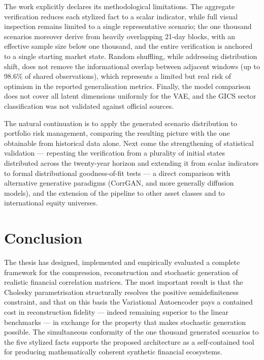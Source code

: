 \documentclass[11pt,a4paper]{article}
\begin{document}
The work explicitly declares its methodological limitations. The aggregate
verification reduces each stylized fact to a scalar indicator, while full
visual inspection remains limited to a single representative scenario; the one
thousand scenarios moreover derive from heavily overlapping 21-day blocks, with
an effective sample size below one thousand, and the entire verification is
anchored to a single starting market state. Random shuffling, while addressing
distribution shift, does not remove the informational overlap between adjacent
windows (up to 98.6\% of shared observations), which represents a limited but
real risk of optimism in the reported generalisation metrics. Finally, the
model comparison does not cover all latent dimensions uniformly for the VAE,
and the GICS sector classification was not validated against official sources.

The natural continuation is to apply the generated scenario distribution to
portfolio risk management, comparing the resulting picture with the one
obtainable from historical data alone. Next come the strengthening of
statistical validation --- repeating the verification from a plurality of
initial states distributed across the twenty-year horizon and extending it from
scalar indicators to formal distributional goodness-of-fit tests --- a direct
comparison with alternative generative paradigms (CorrGAN, and more generally
diffusion models), and the extension of the pipeline to other asset classes and
to international equity universes.

\section{Conclusion}

The thesis has designed, implemented and empirically evaluated a complete framework for the
compression, reconstruction and stochastic generation of realistic financial
correlation matrices. The most important result is that the Cholesky
parametrisation structurally resolves the positive semidefiniteness constraint,
and that on this basis the Variational Autoencoder pays a contained cost in
reconstruction fidelity --- indeed remaining superior to the linear benchmarks
--- in exchange for the property that makes stochastic generation possible.
The simultaneous conformity of the one thousand generated scenarios to the five
stylized facts supports the proposed architecture as a self-contained tool for
producing mathematically coherent synthetic financial ecosystems.
\end{document}
